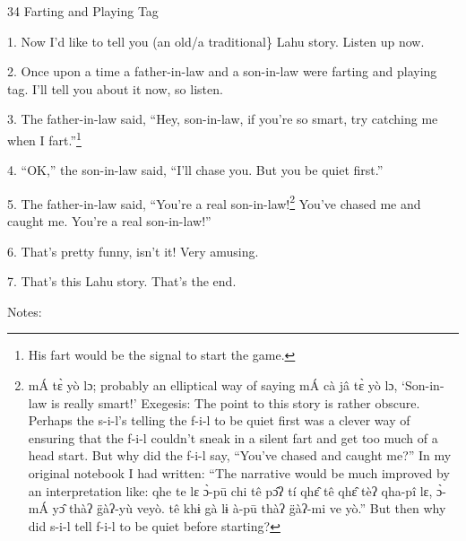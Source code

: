 
34 Farting and Playing Tag

1. Now I'd like to tell you (an old/a traditional\} Lahu story.  Listen up now.

2. Once upon a time a father-in-law and a son-in-law were farting and playing tag.
I'll tell you about it now, so listen.

3. The father-in-law said, ``Hey, son-in-law, if you're so smart, try catching
me when I fart.''\footnote{His fart would be the signal to start the game.}

4. ``OK,'' the son-in-law said, ``I'll chase you.  But you be quiet first.''

5. The father-in-law said, ``You're a real son-in-law!\footnote{mÁ tɛ̀ yò lɔ; probably an elliptical way of saying mÁ cà jâ tɛ̀ yò lɔ, `Son-in-law is really smart!'  Exegesis:  The point to this story is rather obscure.  Perhaps the s-i-l's telling the f-i-l to be quiet first was a clever way of ensuring that the f-i-l couldn't sneak in a silent fart and get too much of a head start.  But why did the f-i-l say, ``You've chased and caught me?''  In my original notebook I had written:  ``The narrative would be much improved by an interpretation like: qhe te lɛ ɔ̀-pū chi tê pɔ̂ʔ tí qhɛ̂ tê qhɛ̂ tèʔ qha-pî lɛ, ɔ̀-mÁ yɔ̂ thàʔ g̈àʔ-yù veyò. tê khɨ gà lɨ à-pū thàʔ g̈àʔ-mi ve yò.''  But then why did s-i-l tell f-i-l to be quiet before starting?} You've chased me and
caught me.  You're a real son-in-law!''

6. That's pretty funny, isn't it!  Very amusing.

7. That's this Lahu story.  That's the end.

Notes:

